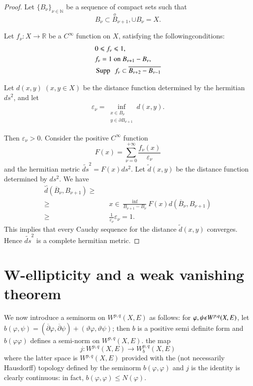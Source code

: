\begin{proof}
  Let $\{B_\nu\}_{\nu \in \mathbb{N}}$ be a sequence of compact sets such that
  $$
  B_\nu \subset \overset{o}{B}_{\nu+1}, \cup B_\nu=X.
  $$

  Let $f_\nu : X\rightarrow \mathbb{R}$ be a $C^\infty$ function on $X$,
  satisfying the following\pageoriginale conditions:
  \begin{align*}
   & 0\leqslant f_\nu \leqslant 1,\\
   & f_\nu=1~ \text{on}~ B _{\nu + 1} -B_\nu ,\\
   & \operatorname{Supp} ~~ f_\nu \subset \overline {B_{\nu+2}-B_{\nu-1}}
  \end{align*}

  Let $d(x,y) \; (x,y \in X)$ be the distance function determined by the
  hermitian $ds^2$, and let 
  \begin{gather*}
    \varepsilon_\nu = \inf_{\substack{x \in B_\nu\\y \in
        \partial B_{\nu+1}}} d(x,y).
  \end{gather*}

  Then $\varepsilon_\nu > 0$. Consider the positive $C^{\infty}$ function 
  $$
  F(x)= {\overset{+\infty}{\underset{\nu=0}\sum}}
  \frac{f_\nu (x)} {\varepsilon_\nu}
  $$ 
  and the hermitian metric $\widetilde{ds}^2 =
  F(x)ds^2$. Let $\tilde{d}(x,y)$ be
  the distance function determined by $ds^2$. We have 
  \begin{align*}
    \overset{\backsim} {d}(\overline {B}_{\nu},
    B_{\nu+1}) \geqslant& \\ 
    \geqslant  & \quad x\in \frac{\inf}{
        B_{\nu+1}- B_\nu} F(x) {d}(\overline B_{\nu}, B_{\nu+1})\\ 
      \geqslant & \quad  \frac{1}{\varepsilon_{\nu}} \varepsilon_\nu = 1.
  \end{align*}  
  This implies that every Cauchy sequence for the distance
  $\tilde{d}(x,y)$ converges. Hence
  $\widetilde{ds}^2$ is a complete hermitian metric. 
\end{proof}

\section{W-ellipticity and a weak vanishing
  theorem}\label{chap1:sec3}\pageoriginale %

We now introduce a seminorm on ${W}^{p,q}(X,E)$ as follows:
for $\varphi, \psi \epsilon {W}^{p,q}\break(X,E)$,  let
  $b(\varphi, \psi) = (\overline{\partial}\varphi,
\overline{\partial}\psi) + (\vartheta \varphi, \vartheta \psi)$;  
then $b$ is a positive semi definite form and $b(\varphi \varphi)$
defines a semi-norm on $W^{p,q}(X,E)$. the map 
$$
j:W^{p,q} (X,E) \rightarrow W_b^{p,q}(X,E)
$$
where the latter space is $W^{p,q} (X,E)$ provided with
the (not necessarily Hausdorff) topology defined by the seminorm
$b(\varphi, \varphi)$ and $j$ is the identity is clearly continuous: in
fact, $b(\varphi, \varphi) \leqslant N(\varphi)$. 

